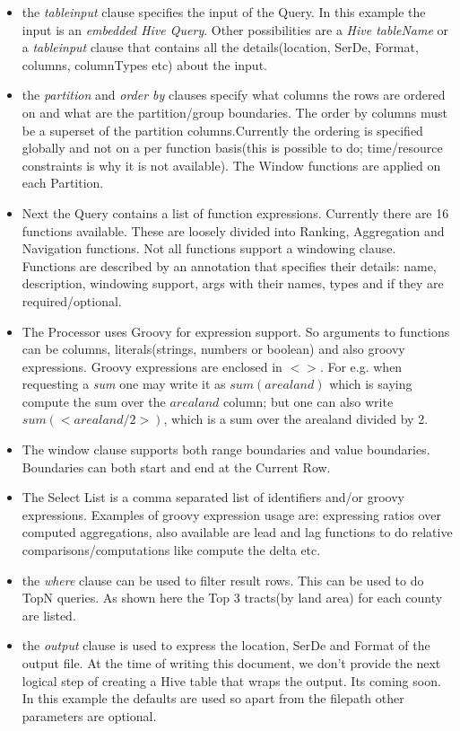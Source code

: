 \documentclass[pdftex,10pt,a4paper]{article}
\begin{document}
  \begin{itemize}
  \item the {\em tableinput} clause specifies the input of the
    Query. In this example the input is an {\em embedded Hive
      Query}. Other possibilities are a {\em Hive tableName} or a {\em
      tableinput} clause that contains all the details(location,
    SerDe, Format, columns, columnTypes etc) about the input.
  \item the {\em partition} and {\em order by} clauses specify what
    columns the rows are ordered on and what are the partition/group
    boundaries. The order by columns must be a superset of the
    partition columns.Currently the ordering is specified globally and
    not on a per function basis(this is possible to do; time/resource
    constraints is why it is not available). The Window functions are applied on each Partition.
  \item Next the Query contains a list of function
    expressions. Currently there are 16 functions available. These are
    loosely  divided into Ranking, Aggregation and Navigation
    functions. Not all functions support a windowing clause. Functions
    are described by an annotation that specifies their details: name,
    description, windowing support, args with their names, types and if they are required/optional.
  \item The Processor uses Groovy for expression support. So arguments
    to functions can be columns, literals(strings, numbers or boolean)
    and also groovy expressions. Groovy expressions are enclosed in
    $<>$. For e.g. when requesting a {\em sum} one may write it as
    $sum(arealand)$ which is saying compute the sum over the $arealand$
   column; but one can also write $sum(<arealand/2>)$, which is a sum
   over the arealand divided by 2.
  \item The window clause supports both range boundaries and value
    boundaries. Boundaries can both start and end at the Current Row.
  \item The Select List is a comma separated list of identifiers
    and/or groovy expressions. Examples of groovy expression usage are:
    expressing ratios over computed aggregations, also available are
    lead and lag functions to do relative comparisons/computations
    like compute the delta etc.
  \item the {\em where} clause can be used to filter result rows. This
    can be used to do TopN queries. As shown here the Top 3 tracts(by
    land area) for each county are listed.
  \item the {\em output} clause is used to express the location, SerDe
    and Format of the output file. At the time of writing this
    document,  we don't provide the next logical step of creating a
    Hive table that wraps the output. Its coming soon. In this example
    the defaults are used so apart from the filepath other parameters
    are optional.
  \end{itemize}
  
\end{document}
